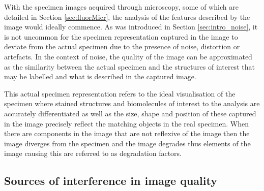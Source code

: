 With the specimen images acquired through microscopy, some of which are detailed in Section \ref{sec:fluorMicr}, the analysis of the features described by the image would ideally commence. As was introduced in Section \ref{sec:intro_noise}, it is not uncommon for the specimen representation captured in the image to deviate from the actual specimen due to the presence of noise, distortion or artefacts. In the context of noise, the quality of the image can be approximated as the similarity between the actual specimen and the structures of interest that may be labelled and what is described in the captured image.\par This actual specimen representation refers to the ideal visualisation of the specimen where stained structures and biomolecules of interest to the analysis are accurately differentiated as well as the size, shape and position of these captured in the image precisely reflect the matching objects in the real specimen. When there are components in the image that are not reflexive of the image then the image diverges from the specimen and the image degrades thus elements of the image causing this are referred to as degradation factors.

\subsection{Sources of interference in image quality}\label{sec:Noises} %


